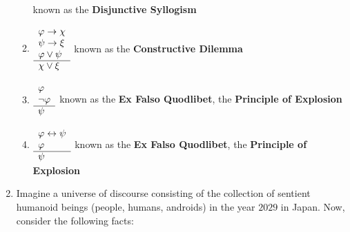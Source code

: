 \begin{enumerate}
\begin{enumerate}
                \)
                \hfill known as the \textbf{Disjunctive Syllogism}
            \item
                \(
                    \begin{array}{l}
                        \varphi \rightarrow \chi \\
                        \psi \rightarrow \xi \\
                        \varphi \join \psi \\
                        \cline{1-1}
                        \chi \join \xi
                    \end{array}
                \)
                \hfill known as the \textbf{Constructive Dilemma}
            \item
                \(
                    \begin{array}{l}
                        \varphi \\
                        \neg \varphi \\
                        \cline{1-1}
                        \psi
                    \end{array}
                \)
                \hfill known as the \textbf{Ex Falso Quodlibet}, \aka the \textbf{Principle of Explosion}
            \item
                \(
                    \begin{array}{l}
                        \varphi \leftrightarrow \psi \\
                        \varphi \\
                        \cline{1-1}
                        \psi
                    \end{array}
                \)
                \hfill known as the \textbf{Ex Falso Quodlibet}, \aka the \textbf{Principle of Explosion}
        \end{enumerate}
    \item
        Imagine a universe of discourse consisting of the collection of sentient humanoid beings
        (\eg people, humans, androids) in the year \(2029\) in Japan.
        Now, consider the following facts:


\end{enumerate}

